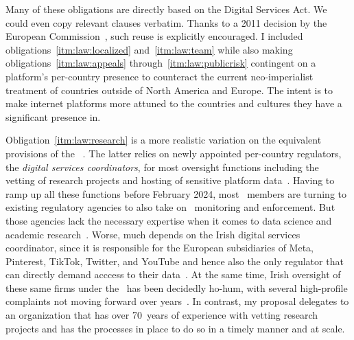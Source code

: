 Many of these obligations are directly based on the Digital Services Act. We
could even copy relevant clauses verbatim. Thanks to a 2011 decision by the
European Commission~\cite{EuropeanCommission2011}, such reuse is explicitly
encouraged. I included obligations~\ref{itm:law:localized}
and~\ref{itm:law:team} while also making obligations~\ref{itm:law:appeals}
through~\ref{itm:law:publicrisk} contingent on a platform's per-country presence
to counteract the current neo-imperialist treatment of countries outside of
North America and Europe. The intent is to make internet platforms more attuned
to the countries and cultures they have a significant presence in.

Obligation~\ref{itm:law:research} is a more realistic variation on the
equivalent provisions of the \DSA~\cite{Vermeulen2022}. The latter relies on
newly appointed per-country regulators, the \emph{digital services
coordinators}, for most oversight functions including the vetting of research
projects and hosting of sensitive platform data~\cite{Jaursch2022,Jaursch2022a}.
Having to ramp up all these functions before February 2024, most \EU\ members
are turning to existing regulatory agencies to also take on \DSA\ monitoring and
enforcement. But those agencies lack the necessary expertise when it comes to
data science and academic research~\cite{Jaursch2023}. Worse, much depends on
the Irish digital services coordinator, since it is responsible for the European
subsidiaries of Meta, Pinterest, TikTok, Twitter, and YouTube and hence also the
only regulator that can directly demand acccess to their
data~\cite{Albert2022,Jaursch2023}. At the same time, Irish oversight of these
same firms under the \GDPR\ has been decidedly ho-hum, with several high-profile
complaints not moving forward over years~\cite{Burgess2022}. In contrast, my
proposal delegates to an organization that has over 70~years of experience with
vetting research projects and has the processes in place to do so in a timely
manner and at scale.

